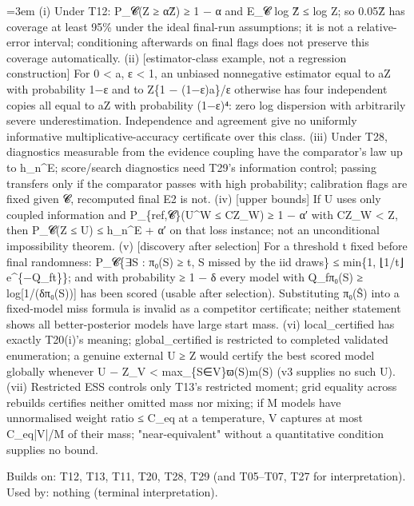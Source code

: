 \documentclass[11pt]{report}
\newenvironment{mdblock}{\begingroup\mdfont\raggedright\setlength{\parindent}{0pt}\setlength{\parskip}{0.55em}\emergencystretch=3em}{\par\endgroup}
\newcommand{\mdhead}[2]{\par\vspace{0.7em}\noindent{\bfseries\ifcase#1\or\large\or\normalsize\or\normalsize\or\small\or\small\or\small\fi #2}\par\nopagebreak\vspace{0.1em}}
\begin{document}
\begin{mdblock}
(i) Under T12: P\_𝓒(Z ≥ αẐ) ≥ 1 − α and E\_𝓒 log Ẑ ≤ log Z; so 0.05Ẑ has coverage at least 95\% under the ideal final-run assumptions; it is not a relative-error interval; conditioning afterwards on final flags does not preserve this coverage automatically. (ii) [estimator-class example, not a regression construction] For 0 < a, ε < 1, an unbiased nonnegative estimator equal to aZ with probability 1−ε and to Z\{1 − (1−ε)a\}/ε otherwise has four independent copies all equal to aZ with probability (1−ε)⁴: zero log dispersion with arbitrarily severe underestimation. Independence and agreement give no uniformly informative multiplicative-accuracy certificate over this class. (iii) Under T28, diagnostics measurable from the evidence coupling have the comparator's law up to h\_n\textasciicircum{}E; score/search diagnostics need T29's information control; passing transfers only if the comparator passes with high probability; calibration flags are fixed given 𝓒, recomputed final E2 is not. (iv) [upper bounds] If U uses only coupled information and P\_\{ref,𝓒\}(U\textasciicircum{}W ≤ CZ\_W) ≥ 1 − α′ with CZ\_W < Z, then P\_𝓒(Z ≤ U) ≤ h\_n\textasciicircum{}E + α′ on that loss instance; not an unconditional impossibility theorem. (v) [discovery after selection] For a threshold t fixed before final randomness: P\_𝓒\{∃S : π₀(S) ≥ t, S missed by the iid draws\} ≤ min\{1, ⌊1/t⌋e\textasciicircum{}\{−Q\_ft\}\}; and with probability ≥ 1 − δ every model with Q\_fπ₀(S) ≥ log[1/(δπ₀(S))] has been scored (usable after selection). Substituting π₀(Ŝ) into a fixed-model miss formula is invalid as a competitor certificate; neither statement shows all better-posterior models have large start mass. (vi) local\_certified has exactly T20(i)'s meaning; global\_certified is restricted to completed validated enumeration; a genuine external U ≥ Z would certify the best scored model globally whenever U − Z\_V < max\_\{S∈V\}ϖ(S)m(S) (v3 supplies no such U). (vii) Restricted ESS controls only T13's restricted moment; grid equality across rebuilds certifies neither omitted mass nor mixing; if M models have unnormalised weight ratio ≤ C\_eq at a temperature, V captures at most C\_eq|V|/M of their mass; "near-equivalent" without a quantitative condition supplies no bound.

\mdhead{2}{Dependencies}

Builds on: T12, T13, T11, T20, T28, T29 (and T05–T07, T27 for interpretation). Used by: nothing (terminal interpretation).

\mdhead{2}{Numerical evidence (provisional)}


\end{mdblock}
\end{document}
